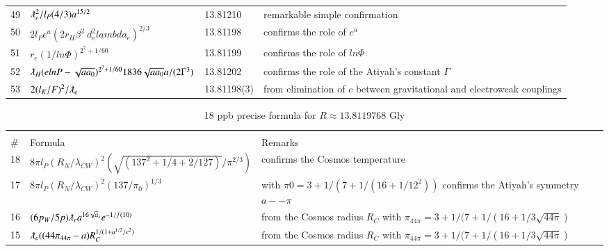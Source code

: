 \documentclass[a4paper,9pt]{article}
\begin{document}
\begin{appendix}
\begin{table}
\begin{tabular}{llll}
    49 & $ \lambdabar_{e}^2/l_P (4/3) a^{15/2}   $ & 13.81210 & remarkable simple confirmation  \\
    
    
    50 & $ 2l_P e^a (2r_H \beta^2 \ d_e^2 lambda_e)^{2/3}   $ & 13.81198 & confirms the role of $e^a$  \\
    
    
    
    51 & $ r_e (1/ln\Phi)^{2^7 + 1/60}   $ & 13.81199 & confirms the role of $ln\Phi$  \\
    
    
    
    
    52 & $ \lambdabar_{H} (elnP-\sqrt{aa_0})^{2^7 + 1/60} 1836 \sqrt{aa_0} a/(2\Gamma^3)   $ & 13.81202& confirms the role of the Atiyah's constant $\Gamma$  \\
    
    
    
    
    
     53 & $ 2(l_K/F)^2/\lambdabar_{e}$ & 13.81198(3) & from elimination of $c$ between gravitational and electroweak couplings \\
   
  
    \bottomrule
  \end{tabular}
\end{table}


\begin{table}
\caption{18 ppb precise formula for $R \approx 13.8119768$ Gly}
\label{tab:6:table6}
  \hskip-2.0cm\begin{tabular}{llll}
    \toprule
    \multicolumn{3}{c}{}                   \\
    \cmidrule(r){1-3}
    \#     & Formula  & Remarks \\
    \midrule
   
  18 & $ 8\pi l_P (R_N/\lambda_{CW})^2 (\sqrt{(137^2 + 1/4 + 2/127)}/\pi^{2/3})   $ & confirms the Cosmos temperature   \\  
   
    17 & $ 8\pi l_P (R_N/\lambda_{CW})^2 (137/\pi_0)^{1/3}   $ & with $\pi0 = 3+1/(7+1/(16+1/12^2))$ confirms the Atiyah's symmetry $a--\pi$    \\
  
   16 & $(6p_W/5p)\lambdabar_{e} a^{16 \sqrt a_s} e^{-1/f(10)}$ & from the Cosmos radius $R_C$ with $\pi_{44\pi} = 3+1/(7 + 1/(16 + 1/3\sqrt{44\pi})$  \\
  
   15 & $\lambdabar_{e} ((44\pi_{44\pi} -a) R_C^{1/(1+ a^{1/2} /e^2)}$ & from the Cosmos radius $R_C$ with $\pi_{44\pi} = 3+1/(7 + 1/(16 + 1/3\sqrt{44\pi})$  \\ 
        

\end{tabular}
\end{table}
\end{appendix}
\end{document}
